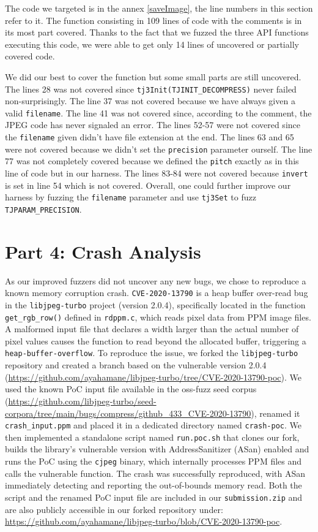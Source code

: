 \documentclass[12pt]{article}
\begin{document}
\noindent The code we targeted is in the annex \ref{saveImage}, the line numbers in this section refer to it. The function consisting in 109 lines of code with the comments is in its most part covered. Thanks to the fact that we fuzzed the three API functions executing this code, we were able to get only 14 lines of uncovered or partially covered code.

\noindent We did our best to cover the function but some small parts are still uncovered. The lines 28 was not covered since \texttt{tj3Init(TJINIT\_DECOMPRESS)} never failed non-surprisingly. The line 37 was not covered because we have always given a valid \texttt{filename}. The line 41 was not covered since, according to the comment, the JPEG code has never signaled an error. The lines 52-57 were not covered since the \texttt{filename} given didn't have file extension at the end. The lines 63 and 65 were not covered because we didn't set the \texttt{precision} parameter ourself. The line 77 was not completely covered because we defined the \texttt{pitch} exactly as in this line of code but in our harness. The lines 83-84 were not covered because \texttt{invert} is set in line 54 which is not covered. Overall, one could further improve our harness by fuzzing the \texttt{filename} parameter and use \texttt{tj3Set} to fuzz \texttt{TJPARAM\_PRECISION}.\\

\section{Part 4: Crash Analysis}
\noindent As our improved fuzzers did not uncover any new bugs, we chose to reproduce a known memory corruption crash. \texttt{CVE-2020-13790} is a heap buffer over-read bug in the \texttt{libjpeg-turbo} project (version 2.0.4), specifically located in the function \texttt{get\_rgb\_row()} defined in \texttt{rdppm.c}, which reads pixel data from PPM image files. A malformed input file that declares a width larger than the actual number of pixel values causes the function to read beyond the allocated buffer, triggering a \texttt{heap-buffer-overflow}. To reproduce the issue, we forked the \texttt{libjpeg-turbo} repository and created a branch based on the vulnerable version 2.0.4 (\url{https://github.com/ayahamane/libjpeg-turbo/tree/CVE-2020-13790-poc}). We used the known PoC input file available in the oss-fuzz seed corpus (\url{https://github.com/libjpeg-turbo/seed-corpora/tree/main/bugs/compress/github_433_CVE-2020-13790}), renamed it \texttt{crash\_input.ppm} and placed it in a dedicated directory named \texttt{crash-poc}. We then implemented a standalone script named \texttt{run.poc.sh} that clones our fork, builds the library's vulnerable version with AddressSanitizer (ASan) enabled and runs the PoC using the \texttt{cjpeg} binary, which internally processes PPM files and calls the vulnerable function. The crash was successfully reproduced, with ASan immediately detecting and reporting the out-of-bounds memory read. Both the script and the renamed PoC input file are included in our \texttt{submission.zip} and are also publicly accessible in our forked repository under: \url{https://github.com/ayahamane/libjpeg-turbo/blob/CVE-2020-13790-poc}.\\
\end{document}
